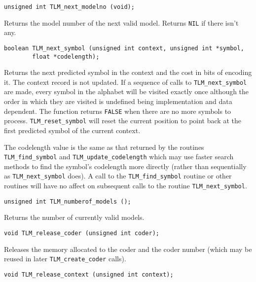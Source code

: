 \documentclass[11pt]{article}
\begin{document}
{\begin{verbatim}
unsigned int TLM_next_modelno (void);
\end{verbatim}

Returns the model number of the next valid model. Returns \verb|NIL| if
there isn't any.

\begin{verbatim}
boolean TLM_next_symbol (unsigned int context, unsigned int *symbol,
        float *codelength);
\end{verbatim}

\vspace{-0.2cm}
Returns the next predicted symbol in the context and the cost in bits of
encoding it. The context record is not updated.
If a sequence of calls to \verb|TLM_next_symbol| are made, every symbol in the alphabet
will be visited exactly once although the order in which they are visited is undefined
being implementation and data dependent. The function returns \verb|FALSE| when there are no
more symbols to process. \verb|TLM_reset_symbol| will reset the current position to point
back at the first predicted symbol of the current context.

The codelength value is the same as that returned by the routines \verb|TLM_find_symbol| and
\verb|TLM_update_codelength| which may use faster search methods to find the symbol's
codelength more directly (rather than sequentially as \verb|TLM_next_symbol| does). A call to
the \verb|TLM_find_symbol| routine or other routines will have no affect on subsequent calls to
the routine \verb|TLM_next_symbol|.

\begin{verbatim}
unsigned int TLM_numberof_models ();
\end{verbatim}

\vspace{-0.2cm}
Returns the number of currently valid models.

\begin{verbatim}
void TLM_release_coder (unsigned int coder);
\end{verbatim}

\vspace{-0.2cm}
Releases the memory allocated to the coder and the coder number (which may
be reused in later \verb|TLM_create_coder| calls).

\begin{verbatim}
void TLM_release_context (unsigned int context);
\end{verbatim}

}
\end{document}
